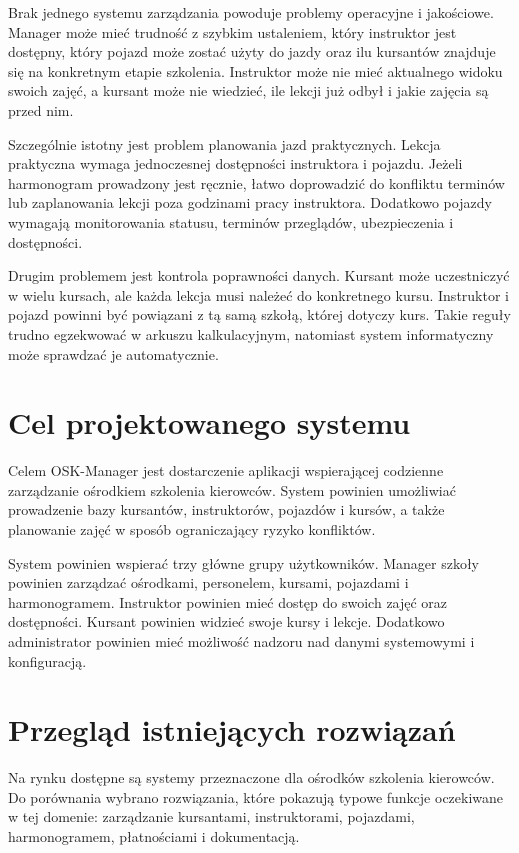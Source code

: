 Brak jednego systemu zarządzania powoduje problemy operacyjne i jakościowe. Manager może mieć trudność z szybkim ustaleniem, który instruktor jest dostępny, który pojazd może zostać użyty do jazdy oraz ilu kursantów znajduje się na konkretnym etapie szkolenia. Instruktor może nie mieć aktualnego widoku swoich zajęć, a kursant może nie wiedzieć, ile lekcji już odbył i jakie zajęcia są przed nim.

Szczególnie istotny jest problem planowania jazd praktycznych. Lekcja praktyczna wymaga jednoczesnej dostępności instruktora i pojazdu. Jeżeli harmonogram prowadzony jest ręcznie, łatwo doprowadzić do konfliktu terminów lub zaplanowania lekcji poza godzinami pracy instruktora. Dodatkowo pojazdy wymagają monitorowania statusu, terminów przeglądów, ubezpieczenia i dostępności.

Drugim problemem jest kontrola poprawności danych. Kursant może uczestniczyć w wielu kursach, ale każda lekcja musi należeć do konkretnego kursu. Instruktor i pojazd powinni być powiązani z tą samą szkołą, której dotyczy kurs. Takie reguły trudno egzekwować w arkuszu kalkulacyjnym, natomiast system informatyczny może sprawdzać je automatycznie.

\section{Cel projektowanego systemu}
\label{sec:celProjektowanegoSystemu}

Celem OSK-Manager jest dostarczenie aplikacji wspierającej codzienne zarządzanie ośrodkiem szkolenia kierowców. System powinien umożliwiać prowadzenie bazy kursantów, instruktorów, pojazdów i kursów, a także planowanie zajęć w sposób ograniczający ryzyko konfliktów.

System powinien wspierać trzy główne grupy użytkowników. Manager szkoły powinien zarządzać ośrodkami, personelem, kursami, pojazdami i harmonogramem. Instruktor powinien mieć dostęp do swoich zajęć oraz dostępności. Kursant powinien widzieć swoje kursy i lekcje. Dodatkowo administrator powinien mieć możliwość nadzoru nad danymi systemowymi i konfiguracją.

\section{Przegląd istniejących rozwiązań}
\label{sec:przegladRozwiazan}

Na rynku dostępne są systemy przeznaczone dla ośrodków szkolenia kierowców. Do porównania wybrano rozwiązania, które pokazują typowe funkcje oczekiwane w tej domenie: zarządzanie kursantami, instruktorami, pojazdami, harmonogramem, płatnościami i dokumentacją.

